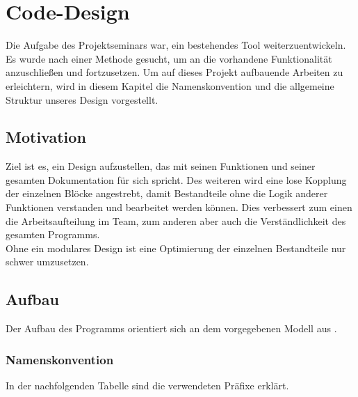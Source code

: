 \documentclass[../Report.tex]{subfiles}
\begin{document}
\chapter{Code-Design}
\label{chap:code}
Die Aufgabe des Projektseminars war, ein bestehendes Tool weiterzuentwickeln. Es wurde nach einer Methode gesucht, um an die vorhandene Funktionalität anzuschließen und fortzusetzen. Um auf dieses Projekt aufbauende Arbeiten zu erleichtern, wird in diesem Kapitel die Namenskonvention und die allgemeine Struktur unseres Design vorgestellt.

\section{Motivation}
\label{sec:code.motivation}
Ziel ist es, ein Design aufzustellen, das mit seinen Funktionen und seiner gesamten Dokumentation für sich spricht. Des weiteren wird eine lose Kopplung der einzelnen Blöcke angestrebt, damit Bestandteile ohne die Logik anderer Funktionen verstanden und bearbeitet werden können. Dies verbessert zum einen die Arbeitsaufteilung im Team, zum anderen aber auch die Verständlichkeit des gesamten Programms. \\
Ohne ein modulares Design ist eine Optimierung der einzelnen Bestandteile nur schwer umzusetzen.

\section{Aufbau}
\label{sec:code.aufbau}
Der Aufbau des Programms orientiert sich an dem vorgegebenen Modell aus .

\subsection*{Namenskonvention}
\label{subsec:code.namen}
In der nachfolgenden Tabelle sind die verwendeten Präfixe erklärt.
	
\end{document}
